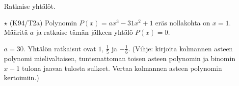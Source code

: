 \begin{tehtavasivu}
\begin{tehtava}
    Ratkaise yhtälöt.
    \begin{alakohdat}
    \end{alakohdat}
    \begin{vastaus}
        \begin{alakohdat}
        \end{alakohdat}
    \end{vastaus}
\end{tehtava}

\begin{tehtava}
$\star$ (K94/T2a) Polynomin $P(x)=ax^3-31x^2+1$ eräs nollakohta on $x=1$. Määritä $a$ ja ratkaise tämän jälkeen yhtälö $P(x)=0$.
\begin{vastaus}
      $a=30$. Yhtälön ratkaisut ovat $1$, $\frac{1}{5}$ ja $-\frac{1}{6}$. (Vihje: kirjoita kolmannen asteen polynomi mielivaltaisen, tuntemattoman toisen asteen polynomin ja binomin $x-1$ tulona jaavaa tulosta sulkeet. Vertaa kolmannen asteen polynomin kertoimiin.)
    \end{vastaus}
\end{tehtava}

\end{tehtavasivu}
